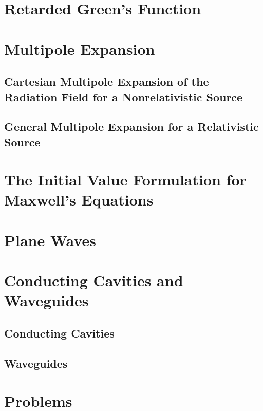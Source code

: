 
 


\section{Retarded Green's Function}\label{sec:5.2}

\section{Multipole Expansion}\label{sec:5.3}

\subsection{Cartesian Multipole Expansion of the Radiation Field for a Nonrelativistic Source}

\subsection{General Multipole Expansion for a Relativistic Source}

\section{The Initial Value Formulation for Maxwell's Equations}\label{sec:5.4}

\section{Plane Waves}\label{sec:5.5}

\section{Conducting Cavities and Waveguides}\label{sec:5.6}

\subsection{Conducting Cavities}

\subsection{Waveguides}


\section*{Problems}


